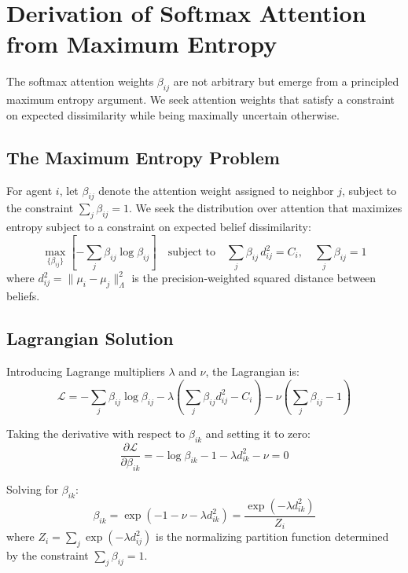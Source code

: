 \documentclass[12pt]{article}
\begin{document}
\section{Derivation of Softmax Attention from Maximum Entropy}
\label{app:softmax}

The softmax attention weights $\beta_{ij}$ are not arbitrary but emerge from a principled maximum entropy argument. We seek attention weights that satisfy a constraint on expected dissimilarity while being maximally uncertain otherwise.

\subsection{The Maximum Entropy Problem}

For agent $i$, let $\beta_{ij}$ denote the attention weight assigned to neighbor $j$, subject to the constraint $\sum_j \beta_{ij} = 1$. We seek the distribution over attention that maximizes entropy subject to a constraint on expected belief dissimilarity:
\begin{equation}
\max_{\{\beta_{ij}\}} \left[ -\sum_j \beta_{ij} \log \beta_{ij} \right] \quad \text{subject to} \quad \sum_j \beta_{ij} \, d_{ij}^2 = C_i, \quad \sum_j \beta_{ij} = 1
\end{equation}
where $d_{ij}^2 = \|\mu_i - \mu_j\|^2_{\Lambda}$ is the precision-weighted squared distance between beliefs.

\subsection{Lagrangian Solution}

Introducing Lagrange multipliers $\lambda$ and $\nu$, the Lagrangian is:
\begin{equation}
\mathcal{L} = -\sum_j \beta_{ij} \log \beta_{ij} - \lambda \left(\sum_j \beta_{ij} d_{ij}^2 - C_i\right) - \nu \left(\sum_j \beta_{ij} - 1\right)
\end{equation}

Taking the derivative with respect to $\beta_{ik}$ and setting it to zero:
\begin{equation}
\frac{\partial \mathcal{L}}{\partial \beta_{ik}} = -\log \beta_{ik} - 1 - \lambda d_{ik}^2 - \nu = 0
\end{equation}

Solving for $\beta_{ik}$:
\begin{equation}
\beta_{ik} = \exp\left(-1 - \nu - \lambda d_{ik}^2\right) = \frac{\exp(-\lambda d_{ik}^2)}{Z_i}
\end{equation}
where $Z_i = \sum_j \exp(-\lambda d_{ij}^2)$ is the normalizing partition function determined by the constraint $\sum_j \beta_{ij} = 1$.
\end{document}
